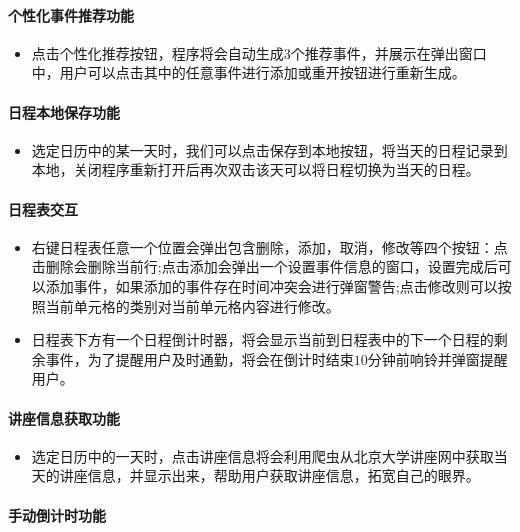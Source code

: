 \documentclass[11pt,hyperref,a4paper,UTF8]{ctexart}
\begin{document}
\begin{CJK}{UTF8}{gkai}
\paragraph{ 个性化事件推荐功能}
\begin{itemize}
    \item 点击个性化推荐按钮，程序将会自动生成$3$个推荐事件，并展示在弹出窗口中，用户可以点击其中的任意事件进行添加或重开按钮进行重新生成。
\end{itemize}

\paragraph{ 日程本地保存功能}
\begin{itemize}
    \item 选定日历中的某一天时，我们可以点击保存到本地按钮，将当天的日程记录到本地，关闭程序重新打开后再次双击该天可以将日程切换为当天的日程。
\end{itemize}


\paragraph{ 日程表交互}
\begin{itemize}
    \item 右键日程表任意一个位置会弹出包含删除，添加，取消，修改等四个按钮：点击删除会删除当前行;点击添加会弹出一个设置事件信息的窗口，设置完成后可以添加事件，如果添加的事件存在时间冲突会进行弹窗警告;点击修改则可以按照当前单元格的类别对当前单元格内容进行修改。
    \item 日程表下方有一个日程倒计时器，将会显示当前到日程表中的下一个日程的剩余事件，为了提醒用户及时通勤，将会在倒计时结束$10$分钟前响铃并弹窗提醒用户。
\end{itemize}

\paragraph{ 讲座信息获取功能}
\begin{itemize}
    \item 选定日历中的一天时，点击讲座信息将会利用爬虫从北京大学讲座网中获取当天的讲座信息，并显示出来，帮助用户获取讲座信息，拓宽自己的眼界。
\end{itemize}

\paragraph{ 手动倒计时功能}


\end{CJK}
\end{document}
